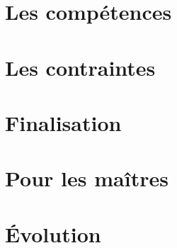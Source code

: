 \documentclass[11pt,oneside]{book}
\begin{document}
\begin{multicols}{2}
    \section{Les compétences}




    \section{Les contraintes}



    \section{Finalisation}


        
    \section{Pour les maîtres}




    \section{Évolution}







    
\end{multicols}
\end{document}
